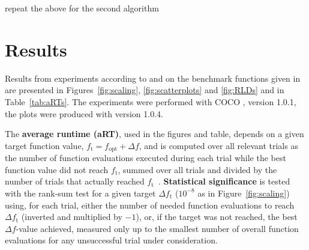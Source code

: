 \documentclass{sig-alternate}
\newcommand{\Df}{\ensuremath{\Delta f}}
\newcommand{\fopt}{\ensuremath{f_\mathrm{opt}}}
\newcommand{\ftarget}{\ensuremath{f_\mathrm{t}}}
\newcommand{\change}[1]{{\color{red} #1}}
\begin{document}
\change{repeat the above for the second algorithm}

\section{Results}

Results from experiments according to \cite{hansen2016exp} and \cite{hansen2016perfass} on the benchmark
functions given in \cite{wp200901_2010,hansen2012fun} are presented in
Figures~\ref{fig:scaling}, \ref{fig:scatterplots} and \ref{fig:RLDs} and
in Table~\ref{tab:aRTs}. The experiments were performed with COCO \cite{hansen2016cocoplat},
version \change{1.0.1}, the plots were produced with version \change{1.0.4}.

The \textbf{average runtime (aRT)}, used in the figures and table, depends on a
given target function value, $\ftarget=\fopt+\Df$, and is computed over all relevant trials
as the number of function evaluations executed during each trial while the best
function value did not reach \ftarget, summed over all trials
and divided by the number of trials that actually reached \ftarget\
\cite{hansen2012exp,price1997dev}. 
\textbf{Statistical significance} is tested with the rank-sum test for a given
target $\Delta\ftarget$ ($10^{-8}$ as in Figure~\ref{fig:scaling}) using,
for each trial, either the number of needed function evaluations to reach
$\Delta\ftarget$ (inverted and multiplied by $-1$), or, if the target was not
reached, the best $\Df$-value achieved, measured only up to the smallest number
of overall function evaluations for any unsuccessful trial under consideration.



\end{document}
